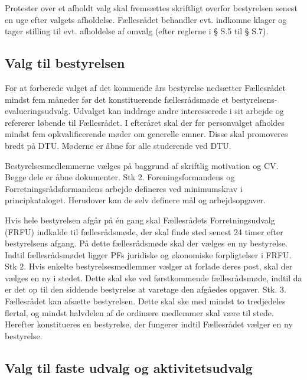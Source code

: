 \begin{list}
\item Protester over et afholdt valg skal fremsættes skriftligt overfor bestyrelsen senest en uge efter valgets afholdelse. Fællesrådet behandler evt. indkomne klager og tager stilling til evt. afholdelse af omvalg (efter reglerne i § S.5 til § S.7).


\subsection{Valg til bestyrelsen}


\item For at forberede valget af det kommende års bestyrelse nedsætter Fællesrådet mindst fem måneder før det
             konstituerende fællesrådsmøde et bestyrelsens-evalueringsudvalg. Udvalget kan inddrage andre interesserede
               i sit arbejde og refererer løbende til Fællesrådet.
                 I efteråret skal der før personvalget afholdes mindst fem opkvalificerende møder om generelle emner. Disse
                   skal promoveres bredt på DTU. Møderne er åbne for alle studerende ved DTU.
\item Bestyrelsesmedlemmerne vælges på baggrund af skriftlig motivation og CV. Begge dele er åbne dokumenter.
Stk 2. Foreningsformandens og Forretningsrådsformandens arbejde defineres ved minimumskrav i
principkataloget. Herudover kan de selv definere mål og arbejdsopgaver.
\item 
Hvis hele bestyrelsen afgår på én gang skal Fællesrådets Forretningsudvalg (FRFU) indkalde til
fællesrådsmøde, der skal finde sted senest 24 timer efter bestyrelsens afgang. På dette fællesrådsmøde skal
der vælges en ny bestyrelse. Indtil fællesrådsmødet ligger PFs juridiske og økonomiske forpligtelser i FRFU.
Stk 2. Hvis enkelte bestyrelsesmedlemmer vælger at forlade deres post, skal der vælges en ny i stedet. Dette
skal ske ved førstkommende fællesrådsmøde, indtil da er det op til den siddende bestyrelse at varetage den
afgåedes opgaver.
Stk. 3. Fællesrådet kan afsætte bestyrelsen. Dette skal ske med mindst to tredjedeles flertal, og mindst
halvdelen af de ordinære medlemmer skal være til stede.
Herefter konstitueres en bestyrelse, der fungerer indtil Fællesrådet vælger en ny bestyrelse.


\subsection{Valg til faste udvalg og aktivitetsudvalg}



\end{list}
